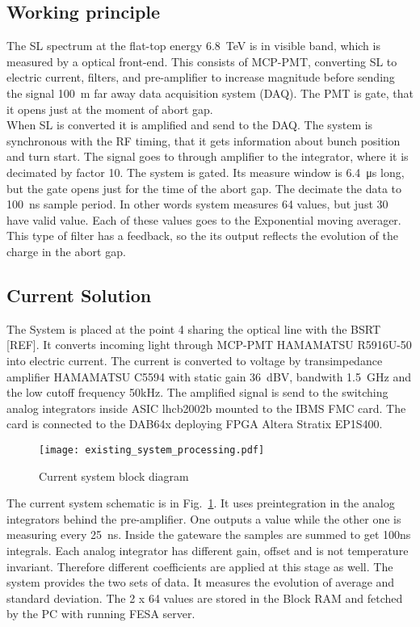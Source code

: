 \subsection{Working principle}
The SL spectrum at the flat-top energy \SI{6.8}{TeV} is in visible band, which
is measured by a optical front-end. This consists of MCP-PMT,
converting SL to electric current, filters, and pre-amplifier to increase
magnitude before sending the signal \SI{100}{m} far away data acquisition
system (DAQ). The PMT is gate, that it opens just at the moment of abort gap. 
\\
When SL is converted it is amplified and send to the DAQ. The system is
synchronous with the RF timing, that it gets information about bunch position
and turn start. The signal goes to through amplifier to the integrator, where
it is decimated by factor 10. The system is gated. Its measure window is
\SI{6.4}{\micro\second} long, but the gate opens just for the time of the abort
gap. The decimate the data to \SI{100}{ns} sample period. In other words system
measures 64 values, but just 30 have valid value. Each of these values goes to
the Exponential moving averager. This type of filter has a feedback, so the
its output reflects the evolution of the charge in the abort gap. 

\subsection{Current Solution}
The System is placed at the point 4 sharing the optical line with the BSRT
[REF]. It converts incoming light through MCP-PMT HAMAMATSU R5916U-50 into
electric current. The current is converted to voltage by transimpedance
amplifier HAMAMATSU C5594 with static gain \SI{36}{dBV}, bandwith \SI{1.5}{GHz}
and the low cutoff frequency 50kHz.
The amplified signal is send to the switching analog integrators inside ASIC
lhcb2002b mounted to the IBMS FMC card. The card is connected to the DAB64x
deploying FPGA Altera Stratix EP1S400. 
\begin{figure}[!tbh]
    \centering
    \texttt{[image: existing\_system\_processing.pdf]}
    \caption{Current system block diagram}
    \label{fig:current_system_processing}
\end{figure}
The current system schematic is in Fig.~\ref{fig:current_system_processing}. It
uses preintegration in the analog integrators behind the pre-amplifier. One
outputs a value while the other one is measuring every \SI{25}{ns}. Inside the
gateware the samples are summed to get 100ns integrals. Each analog integrator
has different gain, offset and is not temperature invariant. Therefore
different coefficients are applied at this stage as well. 
The system provides the two sets of data. It measures the evolution of average
and standard deviation. The 2 x 64 values are stored in the Block RAM and
fetched by the PC with running FESA server.

